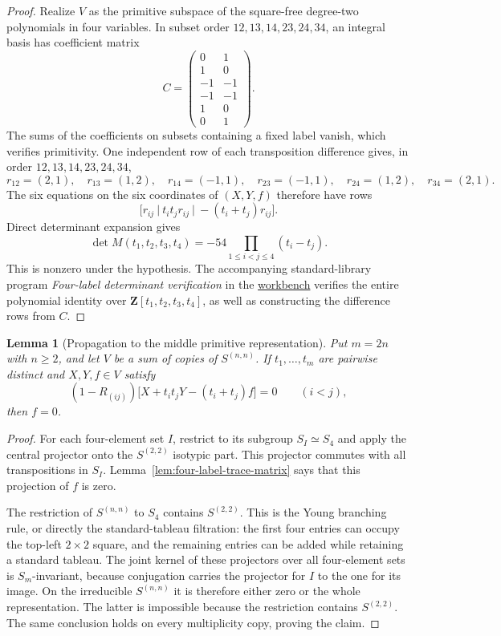 \documentclass[11pt]{article}
\newtheorem{lemma}[theorem]{Lemma}
\theoremstyle{definition}
\theoremstyle{remark}
\newcommand{\workbenchurl}{https://github.com/KokunoYumeto/algebraic-cycles-and-motives-workbench}
\begin{document}
\begin{proof}
Realize $V$ as the primitive subspace of the square-free degree-two
polynomials in four variables.  In subset order $12,13,14,23,24,34$, an
integral basis has coefficient matrix
\[
 C=\begin{pmatrix}
 0&1\\1&0\\-1&-1\\-1&-1\\1&0\\0&1
 \end{pmatrix}.
\]
The sums of the coefficients on subsets containing a fixed label vanish,
which verifies primitivity.  One independent row of each transposition
difference gives, in order $12,13,14,23,24,34$,
\[
 r_{12}=(2,1),\quad r_{13}=(1,2),\quad r_{14}=(-1,1),\quad
 r_{23}=(-1,1),\quad r_{24}=(1,2),\quad r_{34}=(2,1).
\]
The six equations on the six coordinates of $(X,Y,f)$ therefore have rows
\[
 \bigl[r_{ij}\ \big|\ t_it_jr_{ij}\ \big|\ -(t_i+t_j)r_{ij}\bigr].
\]
Direct determinant expansion gives
\begin{equation}\label{eq:four-label-vandermonde}
 \det M(t_1,t_2,t_3,t_4)
 =-54\prod_{1\leq i<j\leq4}(t_i-t_j).
\end{equation}
This is nonzero under the hypothesis.  The accompanying standard-library
program \emph{Four-label determinant verification} in the \href{\workbenchurl}{workbench} verifies the entire polynomial
identity over $\mathbf Z[t_1,t_2,t_3,t_4]$, as well as constructing the
difference rows from $C$.
\end{proof}

\begin{lemma}[Propagation to the middle primitive representation]
\label{lem:four-label-propagation}
Put $m=2n$ with $n\geq2$, and let $V$ be a sum of copies of $S^{(n,n)}$.
If $t_1,\ldots,t_m$ are pairwise distinct and $X,Y,f\in V$ satisfy
\[
 (1-R_{(ij)})\bigl[X+t_it_jY-(t_i+t_j)f\bigr]=0
 \qquad(i<j),
\]
then $f=0$.
\end{lemma}

\begin{proof}
For each four-element set $I$, restrict to its subgroup $S_I\simeq S_4$
and apply the central projector onto the $S^{(2,2)}$ isotypic part.
This projector commutes with all transpositions in $S_I$.
Lemma~\ref{lem:four-label-trace-matrix} says that this projection of $f$
is zero.

The restriction of $S^{(n,n)}$ to $S_4$ contains $S^{(2,2)}$.  This is the
Young branching rule, or directly the standard-tableau filtration: the
first four entries can occupy the top-left $2\times2$ square, and the
remaining entries can be added while retaining a standard tableau.
The joint kernel of these projectors over all four-element sets is
$S_m$-invariant, because conjugation carries the projector for $I$ to the
one for its image.  On the irreducible $S^{(n,n)}$ it is therefore either
zero or the whole representation.  The latter is impossible because the
restriction contains $S^{(2,2)}$.  The same conclusion holds on every
multiplicity copy, proving the claim.
\end{proof}
\end{document}

